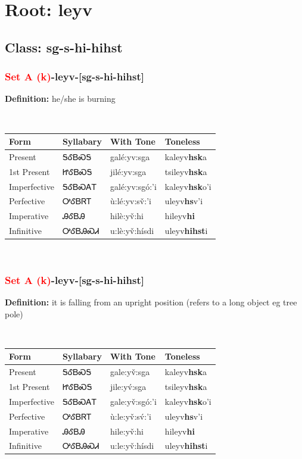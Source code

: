 \needspace{4in}
\section*{Root: leyv}
\nopagebreak
{}
\needspace{3in}
\subsection*{Class: sg-s-hi-hihst}
\nopagebreak
\needspace{2in}
\subsubsection*{\textcolor{Red}{Set A (k)}{-}\textbf{leyv}{-}[sg-s-hi-hihst]}
\nopagebreak
\textbf{Definition: } he/she is burning
\\[0.5em]
\begin{tabularx}{\textwidth}{l X X X}%
\toprule%
\textbf{Form}&\textbf{Syllabary}&\textbf{With Tone}&\textbf{Toneless}\\%
\midrule%
Present&ᎦᎴᏴᏍᎦ&galé:yv:sga&kaleyv\textbf{hsk}a\\%
1st Present&ᏥᎴᏴᏍᎦ&jilé:yv:sga&tsileyv\textbf{hsk}a\\%
Imperfective&ᎦᎴᏴᏍᎪᎢ&galé:yv:sgó:’i&kaleyv\textbf{hsk}o'i\\%
Perfective&ᎤᎴᏴᏒᎢ&ù:lé:yv:sv̌:’i&uleyv\textbf{hs}v'i\\%
Imperative&ᎯᎴᏴᎯ&hilè:yv̌:hi&hileyv\textbf{hi}\\%
Infinitive&ᎤᎴᏴᎯᏍᏗ&u:lè:yv̌:hísdi&uleyv\textbf{hihst}i\\%
\bottomrule%
\end{tabularx}
\\[1em]
\needspace{2in}
\subsubsection*{\textcolor{Red}{Set A (k)}{-}\textbf{leyv}{-}[sg-s-hi-hihst]}
\nopagebreak
\textbf{Definition: } it is falling from an upright position (refers to a long object eg tree{\quotesinglbase} pole)
\\[0.5em]
\begin{tabularx}{\textwidth}{l X X X}%
\toprule%
\textbf{Form}&\textbf{Syllabary}&\textbf{With Tone}&\textbf{Toneless}\\%
\midrule%
Present&ᎦᎴᏴᏍᎦ&gale:yv̌:sga&kaleyv\textbf{hsk}a\\%
1st Present&ᏥᎴᏴᏍᎦ&jile:yv́:sga&tsileyv\textbf{hsk}a\\%
Imperfective&ᎦᎴᏴᏍᎪᎢ&gale:yv̌:sgó:’i&kaleyv\textbf{hsk}o'i\\%
Perfective&ᎤᎴᏴᏒᎢ&ù:le:yv̌:sv́:’i&uleyv\textbf{hs}v'i\\%
Imperative&ᎯᎴᏴᎯ&hile:yv̌:hi&hileyv\textbf{hi}\\%
Infinitive&ᎤᎴᏴᎯᏍᏗ&u:le:yv̌:hísdi&uleyv\textbf{hihst}i\\%
\bottomrule%
\end{tabularx}
\\[1em]